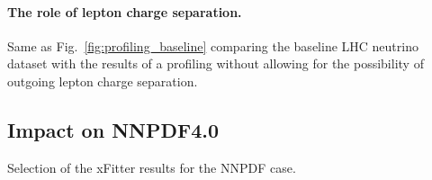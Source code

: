 \paragraph{The role of lepton charge separation.}
%
Same as Fig.~\ref{fig:profiling_baseline} comparing the baseline LHC neutrino dataset with the results
of a profiling without allowing for the possibility of outgoing lepton charge separation.



\subsection{Impact on NNPDF4.0}
\label{sec:nnpdf40}

Selection of the {\sc\small xFitter} results for the NNPDF case.
